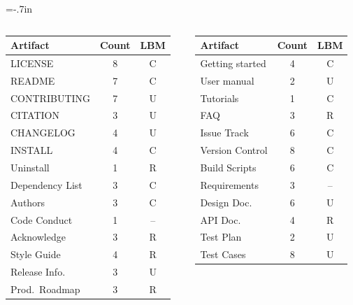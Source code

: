 \documentclass[usenames,dvipsnames]{beamer}
\begin{document}
\hoffset=-.7in %
\begin{frame}[plain]


\begin{columns}
\begin{column}{0.61\textwidth}
\begin{tabular}{ p{2.75cm}cc }
	\toprule
	Artifact & Count & LBM\\
	\midrule
	LICENSE & 8 & C\\
	README & 7 & C\\
	CONTRIBUTING & 7 & U\\
	CITATION & 3 & U\\
	CHANGELOG & 4 & U\\
	INSTALL & 4 & C\\
	\midrule
	Uninstall & 1 & R\\
	Dependency List & 3 & C\\
	Authors & 3 & C\\
	Code Conduct & 1 & --\\
	Acknowledge & 3 & R\\
	Style Guide & 4 & R\\
	Release Info. & 3 & U\\
	Prod.\ Roadmap & 3 & R\\
	\bottomrule
	\end{tabular}
\end{column}
\begin{column}{0.39\textwidth}
  \begin{tabular}{ p{2.75cm}cc }
    \toprule
    Artifact & Count & LBM\\
    \midrule
    Getting started & 4 & C\\
    User manual & 2 & U\\
    Tutorials & 1 & C\\
    FAQ & 3 & R\\
    \midrule
    Issue Track & 6 & C\\
    Version Control & 8 & C\\ 
    Build Scripts & 6 & C\\
    \midrule
    Requirements & 3 & --\\
    Design Doc.\ & 6 & U\\
    API Doc. & 4 & R\\
    Test Plan & 2 & U\\
    Test Cases & 8 & U\\
    \bottomrule
    \end{tabular}
  \end{column}
\end{columns}


\end{frame}
\end{document}
